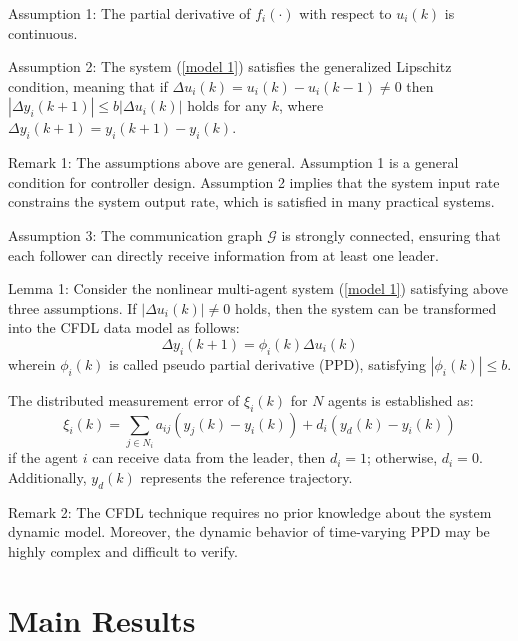 \documentclass[journal,onecolumn]{IEEEtran}
\begin{document}
Assumption 1: The partial derivative of \( f_i(\cdot) \) with respect to \( u_i(k) \) is continuous.

Assumption 2: The system (\ref{model 1}) satisfies the generalized Lipschitz condition, meaning that if \( \Delta u_i(k) = u_i(k) - u_i(k - 1) \neq 0 \) then \( | \Delta y_i(k + 1) | \leq b |\Delta u_i(k)| \) holds for any \( k \), where \( \Delta y_i(k + 1) = y_i(k + 1) - y_i(k) \).
 


Remark 1: The assumptions above are general. Assumption 1 is a general condition for controller design. Assumption 2 implies that the system input rate constrains the system output rate, which is satisfied in many practical systems.

Assumption 3: The communication graph $ \mathcal{G} $ is strongly connected, ensuring that each follower can directly receive information from at least one leader.

Lemma 1\cite{8}: Consider the nonlinear multi-agent system (\ref{model 1}) satisfying above three assumptions. If $ | \Delta u_i(k) | \neq 0 $ holds, then the system can be transformed into the CFDL data model as follows:
\begin{equation}
    \label{model 2}
    \Delta y_i(k+1)=\phi_i(k)\Delta u_i(k)
\end{equation}
wherein \(\phi_i(k)\) is called pseudo partial derivative (PPD), satisfying \( | \phi_i(k) | \leq b\).
 
The distributed measurement error of \(\xi_i(k)\) for $N$ agents is established as:
\begin{equation}
    \label{model 3}
    \xi_i(k) = \sum_{j \in N_i} a_{ij}( y_j(k)-y_i(k)) + d_i(y_d(k) - y_i(k ))
\end{equation}
if the agent $ i $ can receive data from the leader, then $d_i=1$; otherwise, $d_i=0$. Additionally, $y_d(k)$ represents the reference trajectory. 

Remark 2: The CFDL technique requires no prior knowledge about the system dynamic model. Moreover, the dynamic behavior of time-varying PPD may be highly complex and difficult to verify. 
 

\section{Main Results}
\end{document}
